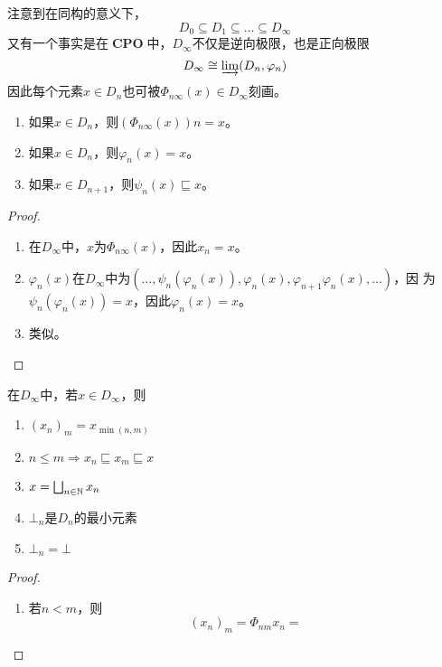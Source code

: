 \documentclass[11pt]{article}
\DeclareMathOperator{\CPO}{\textbf{CPO}}
\begin{document}
注意到在同构的意义下，
\begin{equation*}
D_0\subseteq D_1\subseteq\dots\subseteq D_\infty
\end{equation*}
又有一个事实是在\(\CPO\)中，\(D_\infty\)不仅是逆向极限，也是正向极限
\begin{equation*}
D_\infty\cong\varinjlim(D_n,\varphi_n)
\end{equation*}
因此每个元素\(x\in D_n\)也可被\(\Phi_{n\infty}(x)\in D_\infty\)刻画。

\begin{lemma}[]
\begin{enumerate}
\item 如果\(x\in D_n\)，则\((\Phi_{n\infty}(x))n=x\)。
\item 如果\(x\in D_n\)，则\(\varphi_n(x)=x\)。
\item 如果\(x\in D_{n+1}\)，则\(\psi_n(x)\sqsubseteq x\)。
\end{enumerate}
\end{lemma}

\begin{proof}
\begin{enumerate}
\item 在\(D_\infty\)中，\(x\)为\(\Phi_{n\infty}(x)\)，因此\(x_n=x\)。
\item \(\varphi_n(x)\)在\(D_\infty\)中为\((\dots,\psi_n(\varphi_n(x)),\varphi_n(x),\varphi_{n+1}\varphi_n(x),\dots)\)，因
为\(\psi_n(\varphi_n(x))=x\)，因此\(\varphi_n(x)=x\)。
\item 类似。
\end{enumerate}
\end{proof}

\begin{lemma}[]
在\(D_\infty\)中，若\(x\in D_\infty\)，则
\begin{enumerate}
\item \((x_n)_m=x_{\min(n,m)}\)
\item \(n\le m\Rightarrow x_n\sqsubseteq x_m\sqsubseteq x\)
\item \(x=\bigsqcup_{n\in\mathbb{N}}x_n\)
\item \(\bot_n\)是\(D_n\)的最小元素
\item \(\bot_n=\bot\)
\end{enumerate}
\end{lemma}

\begin{proof}
\begin{enumerate}
\item 若\(n<m\)，则
\begin{equation*}
(x_n)_m=\Phi_{nm}x_n=
\end{equation*}
\end{enumerate}
\end{proof}
\end{document}
